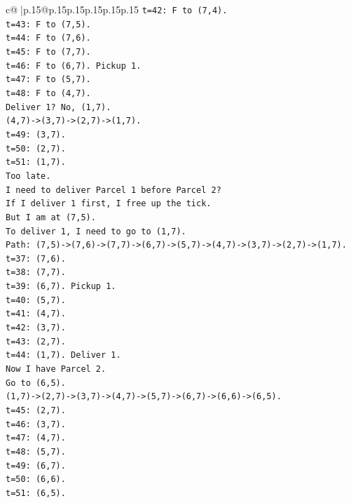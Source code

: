 \documentclass{article}
\begin{document}
{\begin{supertabular}{c@{$\;$}|p{.15\linewidth}@{}p{.15\linewidth}p{.15\linewidth}p{.15\linewidth}p{.15\linewidth}p{.15\linewidth}}
{{{\texttt{t=42: F to (7,4).} \\
\texttt{t=43: F to (7,5).} \\
\texttt{t=44: F to (7,6).} \\
\texttt{t=45: F to (7,7).} \\
\texttt{t=46: F to (6,7). Pickup 1.} \\
\texttt{t=47: F to (5,7).} \\
\texttt{t=48: F to (4,7).} \\
\texttt{Deliver 1? No, (1,7).} \\
\texttt{(4,7){-}>(3,7){-}>(2,7){-}>(1,7).} \\
\texttt{t=49: (3,7).} \\
\texttt{t=50: (2,7).} \\
\texttt{t=51: (1,7).} \\
\texttt{Too late.} \\
\texttt{I need to deliver Parcel 1 before Parcel 2?} \\
\texttt{If I deliver 1 first, I free up the tick.} \\
\texttt{But I am at (7,5).} \\
\texttt{To deliver 1, I need to go to (1,7).} \\
\texttt{Path: (7,5){-}>(7,6){-}>(7,7){-}>(6,7){-}>(5,7){-}>(4,7){-}>(3,7){-}>(2,7){-}>(1,7).} \\
\texttt{t=37: (7,6).} \\
\texttt{t=38: (7,7).} \\
\texttt{t=39: (6,7). Pickup 1.} \\
\texttt{t=40: (5,7).} \\
\texttt{t=41: (4,7).} \\
\texttt{t=42: (3,7).} \\
\texttt{t=43: (2,7).} \\
\texttt{t=44: (1,7). Deliver 1.} \\
\texttt{Now I have Parcel 2.} \\
\texttt{Go to (6,5).} \\
\texttt{(1,7){-}>(2,7){-}>(3,7){-}>(4,7){-}>(5,7){-}>(6,7){-}>(6,6){-}>(6,5).} \\
\texttt{t=45: (2,7).} \\
\texttt{t=46: (3,7).} \\
\texttt{t=47: (4,7).} \\
\texttt{t=48: (5,7).} \\
\texttt{t=49: (6,7).} \\
\texttt{t=50: (6,6).} \\
\texttt{t=51: (6,5).} \\
}}}
\end{supertabular}}
\end{document}
